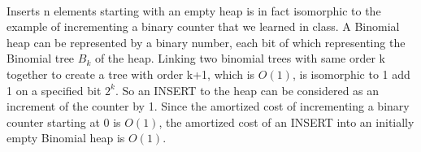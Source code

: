 \begin{problem}{2} ~\\
Inserts n elements starting with an empty heap is in fact isomorphic to the example of incrementing a binary counter that we learned in class. A Binomial heap can be represented by a binary number, each bit of which representing the Binomial tree $B_k$ of the heap. Linking two binomial trees with same order k together to create a tree with order k+1, which is $O(1)$, is isomorphic to 1 add 1 on a specified bit $2^{k}$. So an INSERT to the heap can be considered as an increment of the counter by 1. Since the amortized cost of incrementing a binary counter starting at 0 is $O(1)$, the amortized cost of an INSERT into an initially empty Binomial heap is $O(1)$. 
\end{problem}
